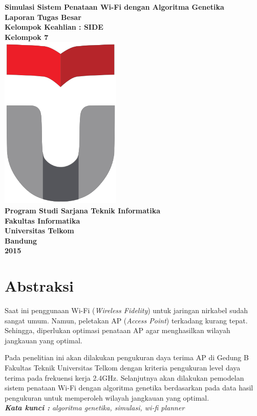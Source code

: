 \documentclass[12pt,a4paper]{report}
\begin{document}
		\begingroup
		\thispagestyle{empty}  
		\begin{center}
			\textbf{
				\Large
				Simulasi Sistem Penataan Wi-Fi dengan Algoritma Genetika\\[1cm]
				\normalsize
				Laporan Tugas Besar	
				\\[1cm]
				Kelompok Keahlian : SIDE\\
				Kelompok 7\\[2cm]
				\includegraphics[width=0.35\linewidth]{logo}\\[2cm]
				\Large
				Program Studi Sarjana Teknik Informatika\\
				Fakultas Informatika\\
				Universitas Telkom\\
				Bandung\\[0.2cm]
				2015}
		\end{center}
		\endgroup
		
		\tableofcontents
		\listoffigures
		\listoftables
		\chapter*{Abstraksi}
			Saat ini penggunaan Wi-Fi (\emph{Wireless Fidelity}) untuk jaringan nirkabel sudah sangat umum. Namun, peletakan AP (\emph{Access Point}) terkadang kurang tepat. Sehingga, diperlukan optimasi penataan AP agar menghasilkan wilayah jangkauan yang optimal.
			
			Pada penelitian ini akan dilakukan pengukuran daya terima AP di Gedung B Fakultas Teknik Universitas Telkom dengan kriteria pengukuran level daya terima pada frekuensi kerja 2.4GHz. Selanjutnya akan dilakukan pemodelan sistem penataan Wi-Fi dengan algoritma genetika berdasarkan pada data hasil pengukuran untuk memperoleh wilayah jangkauan yang optimal.\\[0.5cm]
			\emph{\textbf{Kata kunci : } algoritma genetika, simulasi, wi-fi planner}
		\newpage
		
\end{document}
